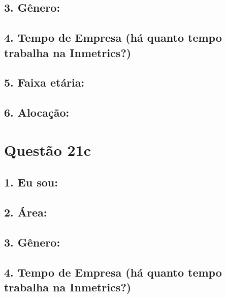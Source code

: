 \documentclass[]{book}
\begin{document}
\hypertarget{genero-62}{%
\subsection{3. Gênero:}\label{genero-62}}

\hypertarget{tempo-de-empresa-ha-quanto-tempo-trabalha-na-inmetrics-62}{%
\subsection{4. Tempo de Empresa (há quanto tempo trabalha na Inmetrics?)}\label{tempo-de-empresa-ha-quanto-tempo-trabalha-na-inmetrics-62}}

\hypertarget{faixa-etaria-62}{%
\subsection{5. Faixa etária:}\label{faixa-etaria-62}}

\hypertarget{alocacao-62}{%
\subsection{6. Alocação:}\label{alocacao-62}}

\hypertarget{questao-21c}{%
\section{Questão 21c}\label{questao-21c}}

\hypertarget{eu-sou-63}{%
\subsection{1. Eu sou:}\label{eu-sou-63}}

\hypertarget{area-63}{%
\subsection{2. Área:}\label{area-63}}

\hypertarget{genero-63}{%
\subsection{3. Gênero:}\label{genero-63}}

\hypertarget{tempo-de-empresa-ha-quanto-tempo-trabalha-na-inmetrics-63}{%
\subsection{4. Tempo de Empresa (há quanto tempo trabalha na Inmetrics?)}\label{tempo-de-empresa-ha-quanto-tempo-trabalha-na-inmetrics-63}}
\end{document}
